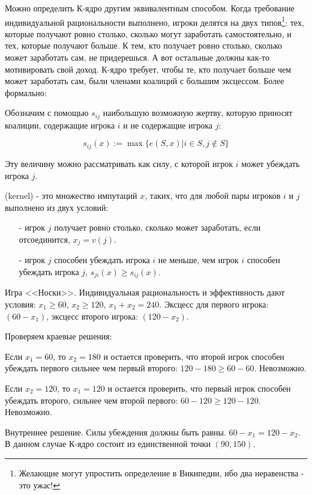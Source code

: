 Можно определить К-ядро другим эквивалентным способом. Когда требование индивидуальной рациональности выполнено, игроки делятся на двух типов\footnote{Желающие могут упростить определение в Википедии, ибо два неравенства - это ужас!}: тех, которые получают ровно столько, сколько могут заработать самостоятельно, и тех, которые получают больше. К тем, кто получает ровно столько, сколько может заработать сам, не придерешься. А вот остальные должны как-то мотивировать свой доход. К-ядро требует, чтобы те, кто получает больше чем может заработать сам, были членами коалиций с большим эксцессом. Более формально:

Обозначим с помощью $s_{ij}$ наибольшую возможную жертву, которую приносят коалиции, содержащие игрока $i$ и не содержащие игрока $j$:

\begin{equation}
s_{ij}(x):=\max\{e(S,x)|i\in S,j\notin S\}
\end{equation}

Эту величину можно рассматривать как силу, с которой игрок $i$ может убеждать игрока $j$. 

\begin{mydef}
  (kernel)  - это множество импутаций $x$, таких, что для любой пары игроков $i$ и $j$ выполнено  из двух условий:
\begin{itemize}
\item[-] игрок $j$ получает ровно столько, сколько может заработать, если отсоединится, $x_{j}=v(j)$.
\item[-] игрок $j$ способен убеждать игрока $i$ не меньше, чем игрок $i$ способен убеждать игрока $j$, $s_{ji}(x)\geq s_{ij}(x)$.
\end{itemize}
\end{mydef}

\begin{myex} Игра <<Носки>>. Индивидуальная рациональность и эффективность дают условия: $x_{1}\geq 60$, $x_{2}\geq 120$, $x_{1}+x_{2}=240$. Эксцесс для первого игрока: $(60-x_{1})$, эксцесс второго игрока: $(120-x_{2})$.

Проверяем краевые решения: 

Если $x_{1}=60$, то $x_{2}=180$ и остается проверить, что второй игрок способен убеждать первого сильнее чем первый второго: $120-180\geq 60-60$. Невозможно.

Если $x_{2}=120$, то $x_{1}=120$ и остается проверить, что первый игрок способен убеждать второго, сильнее чем второй первого: $60-120\geq 120-120$. Невозможно.

Внутреннее решение. Силы убеждения должны быть равны. $60-x_{1}=120-x_{2}$. В данном случае К-ядро состоит из единственной точки $(90,150)$.
\end{myex}

